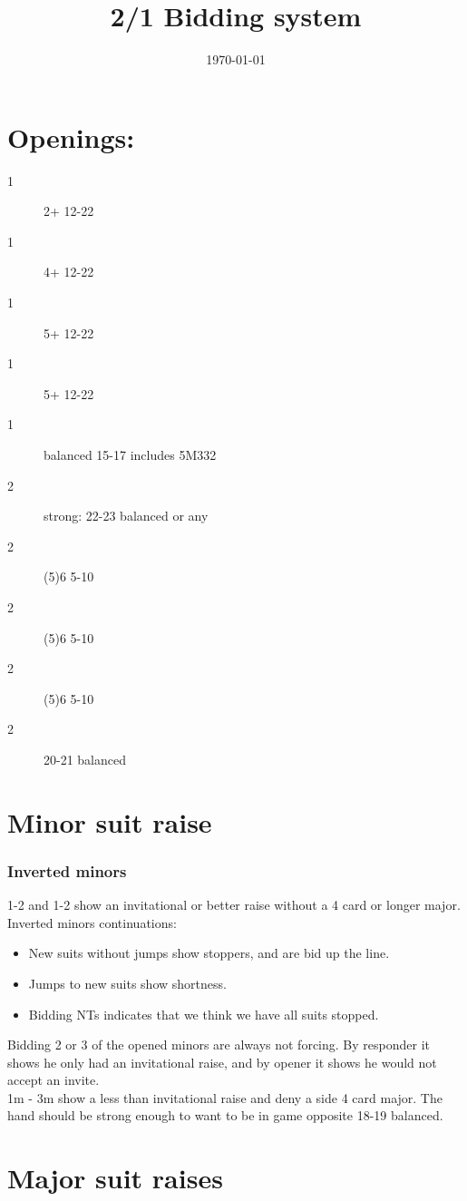 \documentclass[11pt]{article}
\date{\today}
\title{2/1 Bidding system}
\begin{document}
\maketitle
\section*{Openings:}
\label{sec:org6a14610}
\begin{description}
\item[{1}] 2+ 12-22
\item[{1}] 4+ 12-22
\item[{1}] 5+ 12-22
\item[{1}] 5+ 12-22
\item[{1}] balanced 15-17 includes 5M332
\item[{2}] strong: 22-23 balanced or any
\item[{2}] (5)6 5-10
\item[{2}] (5)6 5-10
\item[{2}] (5)6 5-10
\item[{2}] 20-21 balanced
\end{description}
\section*{Minor suit raise}
\label{sec:org8d72aab}
\subsubsection*{Inverted minors}
\label{sec:org9c2e0dd}
1-2 and 1-2 show an invitational or better raise without a 4 card or longer major. \\
Inverted minors continuations:
\begin{itemize}
\item New suits without jumps show stoppers, and are bid up the line.
\item Jumps to new suits show shortness.
\item Bidding NTs indicates that we think we have all suits stopped.
\end{itemize}
Bidding 2 or 3 of the opened minors are always not forcing. By responder it shows he only had an invitational raise, and by opener it shows he would not accept an invite. \\

1m - 3m show a less than invitational raise and deny a side 4 card major. The hand should be strong enough to want to be in game opposite 18-19 balanced. 
\section*{Major suit raises}
\label{sec:org0bcd976}
\end{document}
